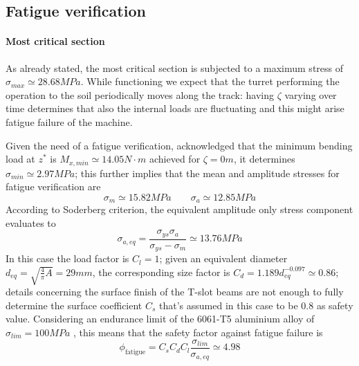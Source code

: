 \subsection{Fatigue verification}
	\paragraph{Most critical section} As already stated, the most critical section is subjected to a maximum stress of $\sigma_{max} \simeq 28.68MPa$. While functioning we expect that the turret performing the operation to the soil periodically moves along the track: having $\zeta$ varying over time determines that also the internal loads are fluctuating and this might arise fatigue failure of the machine.
	
	Given the need of a fatigue verification, acknowledged that the minimum bending load at $z^*$ is $M_{x,min} \simeq 14.05N\cdot m$ achieved for $\zeta = 0m$, it determines $\sigma_{min} \simeq 2.97MPa$; this further implies that the mean and amplitude stresses for fatigue verification are
	\[ \sigma_m \simeq 15.82 MPa \qquad \sigma_a \simeq 12.85MPa \]
	According to Soderberg criterion, the equivalent amplitude only stress component evaluates to
	\[ \sigma_{a,eq} = \frac{\sigma_{ys} \sigma_a}{\sigma_{ys} - \sigma_m} \simeq 13.76MPa  \] 
	In this case the load factor is $C_l=1$; given an equivalent diameter $d_{eq} = \sqrt{\frac 4\pi A} = 29mm$, the corresponding size factor is $C_d = 1.189d_{eq}^{-0.097} \simeq 0.86$; details concerning the surface finish of the T-slot beams are not enough to fully determine the surface coefficient $C_s$ that's assumed in this case to be $0.8$ as safety value. Considering an endurance limit of the 6061-T5 aluminium alloy of $\sigma_{lim} = 100MPa$ \cite{aluminium-endurance}, this means that the safety factor against fatigue failure is
	\[ \phi_\textrm{fatigue} = C_sC_dC_l\frac{\sigma_{lim}}{\sigma_{a,eq}} \simeq 4.98 \]